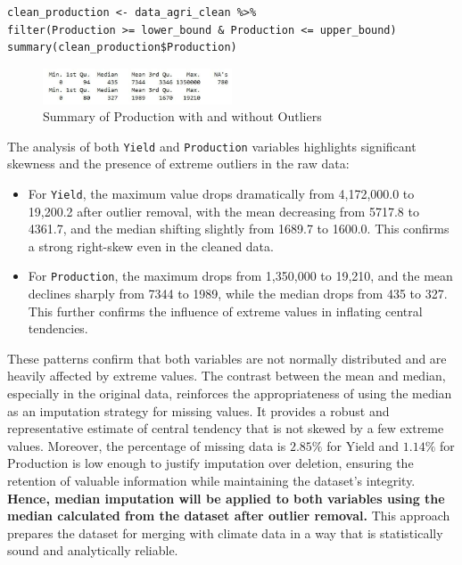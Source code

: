 \begin{verbatim}
clean_production <- data_agri_clean %>% 
filter(Production >= lower_bound & Production <= upper_bound)
summary(clean_production$Production)
\end{verbatim}

\begin{figure}[h]
\centering
\includegraphics[width=0.5\textwidth]{figures/summ_prod.jpg}
\caption{Summary of Production with and without Outliers}
\end{figure}

The analysis of both \texttt{Yield} and \texttt{Production} variables highlights significant skewness and the presence of extreme outliers in the raw data:
\begin{itemize}
    \item For \texttt{Yield}, the maximum value drops dramatically from 4,172,000.0 to 19,200.2 after outlier removal, with the mean decreasing from 5717.8 to 4361.7, and the median shifting slightly from 1689.7 to 1600.0. This confirms a strong right-skew even in the cleaned data.
    \item For \texttt{Production}, the maximum drops from 1,350,000 to 19,210, and the mean declines sharply from 7344 to 1989, while the median drops from 435 to 327. This further confirms the influence of extreme values in inflating central tendencies.
\end{itemize}

These patterns confirm that both variables are not normally distributed and are heavily affected by extreme values. The contrast between the mean and median, especially in the original data, reinforces the appropriateness of using the median as an imputation strategy for missing values. It provides a robust and representative estimate of central tendency that is not skewed by a few extreme values.
Moreover, the percentage of missing data is $2.85\%$ for Yield and $1.14\%$ for Production  is low enough to justify imputation over deletion, ensuring the retention of valuable information while maintaining the dataset’s integrity.
\textbf{Hence, median imputation will be applied to both variables using the median calculated from the dataset after outlier removal.} This approach prepares the dataset for merging with climate data in a way that is statistically sound and analytically reliable.

